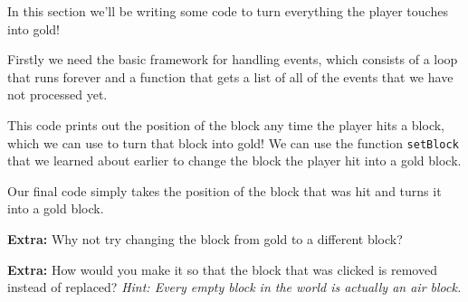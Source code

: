 		In this section we'll be writing some code to turn everything the player touches into gold!

		Firstly we need the basic framework for handling events, which consists of a loop that runs forever and a function that gets a list of all of the events that we have not processed yet.

		

		This code prints out the position of the block any time the player hits a block, which we can use to turn that block into gold! We can use the function \texttt{setBlock} that we learned about earlier to change the block the player hit into a gold block.

		

		Our final code simply takes the position of the block that was hit and turns it into a gold block.

		\textbf{Extra:} Why not try changing the block from gold to a different block?

		\textbf{Extra:} How would you make it so that the block that was clicked is removed instead of replaced? \textit{Hint: Every empty block in the world is actually an air block.}
